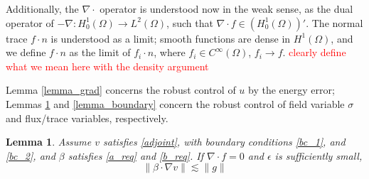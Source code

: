 \documentclass[11pt,onecolumn]{scrartcl}
\newcommand{\grad}{\nabla}
\renewcommand{\div}{\grad \cdot}
\newtheorem{lemma}{Lemma}
\begin{document}
Additionally, the $\div$ operator is understood now in the weak sense, as the dual operator of $-\grad : H_0^1(\Omega) \rightarrow L^2(\Omega)$, such that $\div f \in \left(H_0^1(\Omega)\right)'$. The normal trace $f\cdot n$ is understood as a limit; smooth functions are dense in $H^1(\Omega)$, and we define $f\cdot n$ as the limit of $f_i\cdot n$, where $f_i \in C^\infty(\Omega)$, $f_i \rightarrow f$.
\textcolor{red}{clearly define what we mean here with the density argument}

Lemma \ref{lemma_grad} concerns the robust control of $u$ by the energy error; Lemmas \ref{lemma_stream} and \ref{lemma_boundary} concern the robust control of field variable $\sigma$ and flux/trace variables, respectively.  

\begin{lemma} 
\label{lemma_stream}
Assume $v$ satisfies \eqref{adjoint}, with boundary conditions \eqref{bc_1}, and \eqref{bc_2}, and $\beta$ satisfies \eqref{a_req} and \eqref{b_req}.  If $\div f = 0$ and $\epsilon$ is sufficiently small, 
\[
\|\beta \cdot \grad v \| \lesssim \| g\|
\]
\end{lemma}
\end{document}
